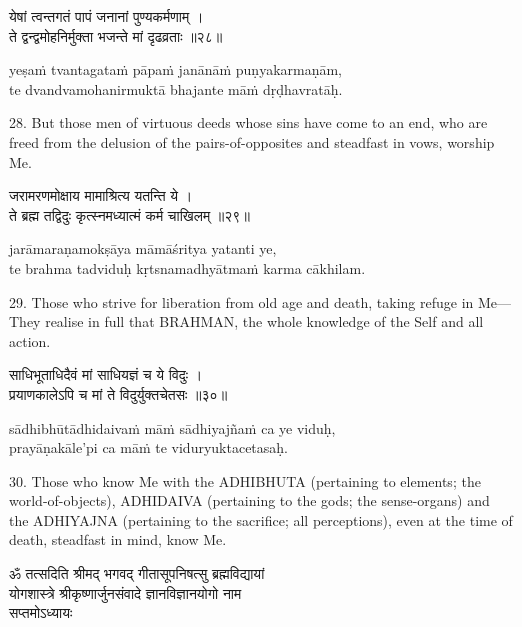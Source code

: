 \begin{gitaverse}
येषां त्वन्तगतं पापं जनानां पुण्यकर्मणाम् । \\
ते द्वन्द्वमोहनिर्मुक्ता भजन्ते मां दृढव्रताः ॥२८॥
\end{gitaverse}

\begin{transliteration}
yeṣaṁ tvantagataṁ pāpaṁ janānāṁ puṇyakarmaṇām, \\
te dvandvamohanirmuktā bhajante māṁ dṛḍhavratāḥ.
\end{transliteration}

28. But those men of virtuous deeds whose sins have come to an end, who are
freed from the delusion of the pairs-of-opposites and steadfast in vows,
worship Me.

\begin{gitaverse}
जरामरणमोक्षाय मामाश्रित्य यतन्ति ये । \\
ते ब्रह्म तद्विदुः कृत्स्नमध्यात्मं कर्म चाखिलम् ॥२९॥
\end{gitaverse}

\begin{transliteration}
jarāmaraṇamokṣāya māmāśritya yatanti ye, \\
te brahma tadviduḥ kṛtsnamadhyātmaṁ karma cākhilam.
\end{transliteration}

29. Those who strive for liberation from old age and death, taking refuge in
Me---They realise in full that BRAHMAN, the whole knowledge of the Self and all
action.

\begin{gitaverse}
साधिभूताधिदैवं मां साधियज्ञं च ये विदुः । \\
प्रयाणकालेऽपि च मां ते विदुर्युक्तचेतसः ॥३०॥
\end{gitaverse}

\begin{transliteration}
sādhibhūtādhidaivaṁ māṁ sādhiyajñaṁ ca ye viduḥ, \\
prayāṇakāle'pi ca māṁ te viduryuktacetasaḥ.
\end{transliteration}

30. Those who know Me with the ADHIBHUTA (pertaining to elements; the
world-of-objects), ADHIDAIVA (pertaining to the gods; the sense-organs) and the
ADHIYAJNA (pertaining to the sacrifice; all perceptions), even at the time of
death, steadfast in mind, know Me.

\begin{gitaverse}
ॐ तत्सदिति श्रीमद् भगवद् गीतासूपनिषत्सु ब्रह्मविद्यायां \\
योगशास्त्रे श्रीकृष्णार्जुनसंवादे ज्ञानविज्ञानयोगो नाम \\
सप्तमोऽध्यायः
\end{gitaverse}


